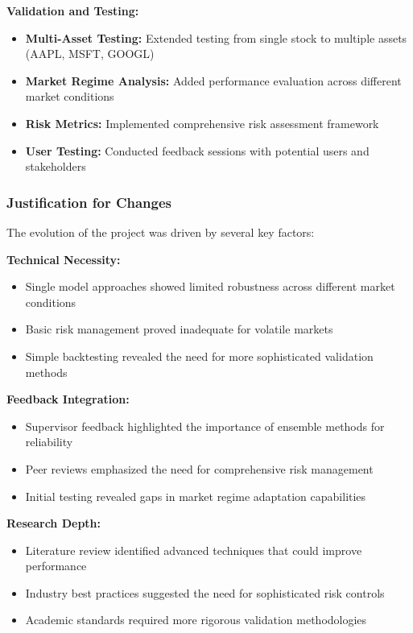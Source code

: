 \documentclass[conference]{IEEEtran}
\begin{document}
\textbf{Validation and Testing:}
\begin{itemize}
    \item \textbf{Multi-Asset Testing:} Extended testing from single stock to multiple assets (AAPL, MSFT, GOOGL)
    \item \textbf{Market Regime Analysis:} Added performance evaluation across different market conditions
    \item \textbf{Risk Metrics:} Implemented comprehensive risk assessment framework
    \item \textbf{User Testing:} Conducted feedback sessions with potential users and stakeholders
\end{itemize}

\subsubsection{Justification for Changes}
The evolution of the project was driven by several key factors:

\textbf{Technical Necessity:}
\begin{itemize}
    \item Single model approaches showed limited robustness across different market conditions
    \item Basic risk management proved inadequate for volatile markets
    \item Simple backtesting revealed the need for more sophisticated validation methods
\end{itemize}

\textbf{Feedback Integration:}
\begin{itemize}
    \item Supervisor feedback highlighted the importance of ensemble methods for reliability
    \item Peer reviews emphasized the need for comprehensive risk management
    \item Initial testing revealed gaps in market regime adaptation capabilities
\end{itemize}

\textbf{Research Depth:}
\begin{itemize}
    \item Literature review identified advanced techniques that could improve performance
    \item Industry best practices suggested the need for sophisticated risk controls
    \item Academic standards required more rigorous validation methodologies
\end{itemize}
\end{document}

